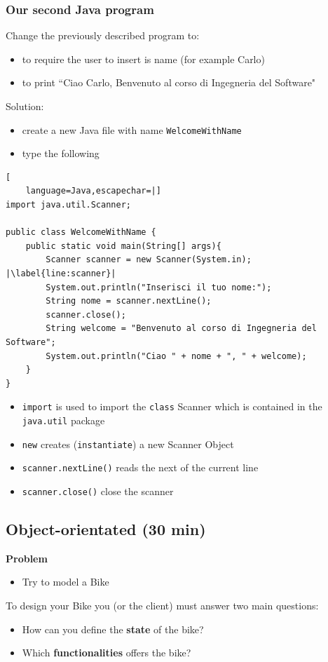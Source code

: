 \documentclass{article}
\theoremstyle{definition}
\begin{document}
\subsubsection{Our second Java program}
Change the previously described program to:
\begin{itemize}
\item to require the user to insert is name (for example Carlo)
\item to print ``Ciao Carlo, Benvenuto al corso di Ingegneria del Software" 
\end{itemize}
Solution:
\begin{itemize}
\item create a new Java file with name \texttt{WelcomeWithName}
\item type the following
\end{itemize}
\begin{lstlisting}[
    language=Java,escapechar=|]
import java.util.Scanner;

public class WelcomeWithName {
	public static void main(String[] args){
		Scanner scanner = new Scanner(System.in); |\label{line:scanner}|
		System.out.println("Inserisci il tuo nome:");
		String nome = scanner.nextLine();
		scanner.close();
		String welcome = "Benvenuto al corso di Ingegneria del Software";
		System.out.println("Ciao " + nome + ", " + welcome);
	}
}
\end{lstlisting}
\begin{itemize}
\item \texttt{import} is used to import the \texttt{class} Scanner which is contained in the \texttt{java.util} package
\item \texttt{new} creates (\texttt{instantiate}) a new Scanner Object
\item \texttt{scanner.nextLine()} reads the next of the current line
\item \texttt{scanner.close()} close the scanner
\end{itemize}


\subsection{Object-orientated (30 min)}
\textbf{Problem}
\begin{itemize}
\item Try to model a Bike
\end{itemize}

To design your Bike you (or the client) must answer two main questions:
\begin{itemize}
\item How can you define the \textbf{state} of the bike?
\item Which \textbf{functionalities} offers the bike?
\end{itemize}
\end{document}
